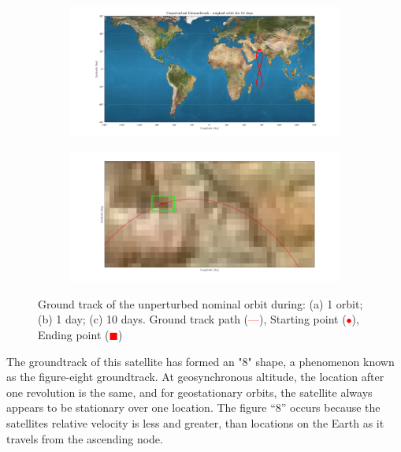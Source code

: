 \documentclass{article}
\newcommand{\reddashedline}{\textcolor{red}{---}}
\begin{document}
\begin{figure}[ht]
	\vspace{1cm} %
	\begin{subfigure}[b]{0.45\textwidth}
		\includegraphics[width=\textwidth]{ug10d.png}
		\caption{}
		\label{fig:1c}
	\end{subfigure}
	\hfill
	\begin{subfigure}[b]{0.45\textwidth}
		\includegraphics[width=\textwidth]{ugstartend.png}
		\caption{}
		\label{fig:1d}
	\end{subfigure}
	\caption{Ground track of the unperturbed nominal orbit during: (a) 1 orbit; (b) 1 day; (c) 10 days. Ground track path (\reddashedline), Starting point (\textcolor{red}{$\bullet$}), Ending point (\textcolor{red}{$\blacksquare$})
	}
\end{figure}

\begin{flushleft}
	The groundtrack of this satellite has formed an "8" shape, a phenomenon known as the figure-eight groundtrack. At geosynchronous altitude, the location after one revolution is the same, and for geostationary  orbits, the satellite always appears to be stationary over one location. The figure “8” occurs because the satellites relative velocity is less and greater, than locations on the Earth as it travels from the ascending node. 
\end{flushleft}
\end{document}
